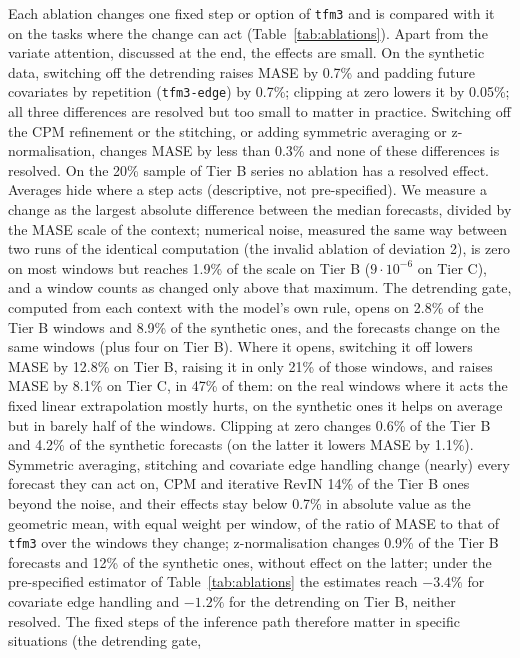 Each ablation changes one fixed step or option of \texttt{tfm3} and is compared with it on the tasks where the change can act
(Table~\ref{tab:ablations}). Apart from the variate attention, discussed at the end, the effects are small. On the synthetic data, switching off the detrending raises MASE by 0.7\% and
padding future covariates by repetition (\texttt{tfm3-edge}) by 0.7\%; clipping at zero lowers it by 0.05\%; all three differences
are resolved but too small to matter in practice. Switching off the CPM refinement or the stitching, or adding symmetric averaging or
z-normalisation, changes MASE by less than 0.3\% and none of these differences is resolved. On the 20\% sample of Tier B series no
ablation has a resolved effect. Averages hide where a step acts (descriptive, not pre-specified). We measure a change as the largest absolute difference between
the median forecasts, divided by the MASE scale of the context; numerical noise, measured the same way between two runs of the
identical computation (the invalid ablation of deviation 2), is zero on most windows but reaches 1.9\% of the scale on Tier B
($9 \cdot 10^{-6}$ on Tier C), and a window counts as changed only above that maximum. The detrending gate, computed from each context with
the model's own rule, opens on 2.8\% of the Tier B windows and 8.9\% of the synthetic ones, and the forecasts change on the same
windows (plus four on Tier B). Where it opens, switching it off lowers MASE by 12.8\% on Tier B, raising it in only 21\% of those
windows, and raises MASE by 8.1\% on Tier C, in 47\% of them: on the real windows where it acts the fixed linear extrapolation
mostly hurts, on the synthetic ones it helps on average but in barely half of the windows. Clipping at zero changes 0.6\% of the
Tier B and 4.2\% of the synthetic forecasts (on the latter it lowers MASE by 1.1\%). Symmetric averaging, stitching and covariate
edge handling change (nearly) every forecast they can act on, CPM and iterative RevIN 14\% of the Tier B ones beyond the noise,
and their effects stay below 0.7\% in absolute value as the geometric mean, with equal weight per window, of the ratio of MASE to
that of \texttt{tfm3} over the windows they change; z-normalisation changes 0.9\% of the Tier B forecasts and 12\% of the synthetic ones,
without effect on the latter; under the pre-specified estimator of Table~\ref{tab:ablations} the estimates reach
$-3.4\%$ for covariate edge handling and $-1.2\%$ for the detrending on Tier B, neither resolved. The fixed steps of the inference path therefore matter in specific situations (the detrending gate,
